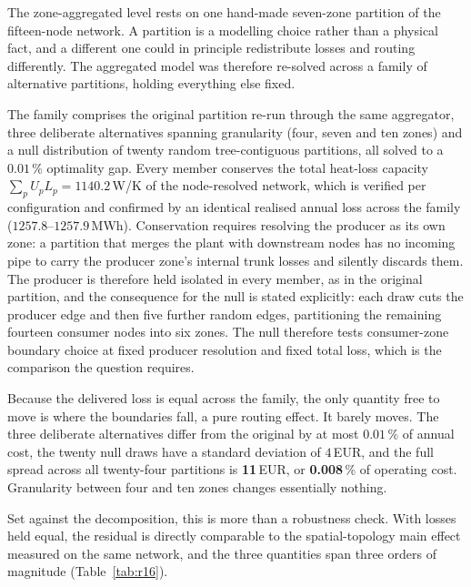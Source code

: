 \documentclass[a4paper,fleqn]{cas-sc}
\begin{document}
The zone-aggregated level rests on one hand-made seven-zone partition of the fifteen-node
network. A partition is a modelling choice rather than a physical fact, and a different one
could in principle redistribute losses and routing differently. The aggregated model was
therefore re-solved across a family of alternative partitions, holding everything else fixed.

The family comprises the original partition re-run through the same aggregator, three
deliberate alternatives spanning granularity (four, seven and ten zones) and a null
distribution of twenty random tree-contiguous partitions, all solved to a $0.01$\,\%
optimality gap. Every member conserves the total heat-loss capacity
$\sum_p U_p L_p = 1140.2$\,W/K of the node-resolved network, which is verified per
configuration and confirmed by an identical realised annual loss across the family
($1257.8$--$1257.9$\,MWh). Conservation requires resolving the producer as its own zone: a
partition that merges the plant with downstream nodes has no incoming pipe to carry the
producer zone's internal trunk losses and silently discards them. The producer is therefore held
isolated in every member, as in the original partition, and the consequence for the null is
stated explicitly: each draw cuts the producer edge and then
five further random edges, partitioning the remaining fourteen consumer nodes into six
zones. The null therefore tests consumer-zone boundary choice at fixed producer resolution
and fixed total loss, which is the comparison the question requires.

Because the delivered loss is equal across the family, the only quantity free to move is
where the boundaries fall, a pure routing effect. It barely moves. The three deliberate
alternatives differ from the original by at most $0.01$\,\% of annual cost, the twenty null
draws have a standard deviation of $4$\,EUR, and the full spread across all twenty-four
partitions is \textbf{11}\,EUR, or \textbf{0.008}\,\% of operating cost. Granularity between
four and ten zones changes essentially nothing.

Set against the decomposition, this is more than a robustness check. With losses held
equal, the residual is directly comparable to the spatial-topology main effect measured on
the same network, and the three quantities span three orders of magnitude
(Table~\ref{tab:r16}).
\end{document}
